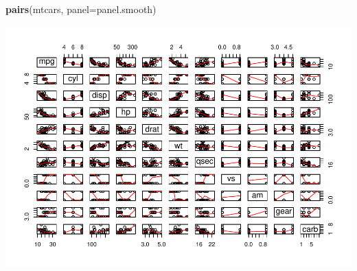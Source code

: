 \documentclass[]{article}
\newenvironment{Shaded}{\begin{snugshade}}{\end{snugshade}}
\newcommand{\KeywordTok}[1]{\textcolor[rgb]{0.13,0.29,0.53}{\textbf{{#1}}}}
\newcommand{\DataTypeTok}[1]{\textcolor[rgb]{0.13,0.29,0.53}{{#1}}}
\newcommand{\NormalTok}[1]{{#1}}
\begin{document}
\begin{Shaded}
\begin{Highlighting}[]
\KeywordTok{pairs}\NormalTok{(mtcars, }\DataTypeTok{panel=}\NormalTok{panel.smooth)}
\end{Highlighting}
\end{Shaded}

\includegraphics{statproject_files/figure-latex/unnamed-chunk-8-1.pdf}
\end{document}
